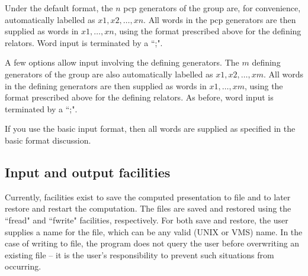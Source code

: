 Under the default format, the $n$ pcp generators of the group
are, for convenience, automatically labelled as $x1, x2, \ldots, xn$.  
All words in the pcp generators are then supplied as words 
in $x1, \ldots, xn$, using the format prescribed above 
for the defining relators. Word input is terminated by a ``;". 

A few options allow input involving the defining generators.
The $m$ defining generators of the group are also automatically 
labelled as $x1, x2, \ldots, xm$.  All words in the defining 
generators are then supplied as words in $x1, \ldots, xm$, 
using the format prescribed above for the defining relators. 
As before, word input is terminated by a ``;". 

If you use the basic input format, then all words are
supplied as specified in the basic format discussion.

\subsection{Input and output facilities}
Currently, facilities exist to save the computed presentation to file
and to later restore and restart the computation. The files are saved and
restored using the ``fread" and  ``fwrite" facilities, respectively. 
For both save and restore, the user supplies a name for the file, 
which can be any valid (UNIX or VMS) name. In the case of writing to file, 
the program does not query the user before overwriting 
an existing file -- it is the user's responsibility to prevent 
such situations from occurring.

